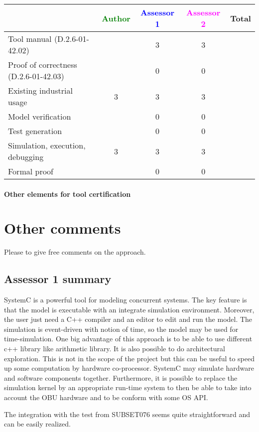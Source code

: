 \begin{assesor1}
\begin{tabular}{|l | c | c | c | c|}
\hline
& \textcolor{green}{Author} & \textcolor{blue}{Assessor 1} & \textcolor{magenta}{Assessor 2} & Total \\
\hline
Tool manual (D.2.6-01-42.02) & &3 &3 & \\
\hline
Proof of correctness (D.2.6-01-42.03) & &0 &0 & \\
\hline
Existing industrial usage &3 &3 &3 & \\
\hline
Model verification & &0 &0 & \\
\hline
Test generation & &0 &0 & \\
\hline
Simulation, execution, debugging &3 &3 &3 & \\
\hline
Formal proof & &0 &0 & \\
\hline
\end{tabular}

\paragraph{Other elements for tool certification}

\section{Other comments}
Please to give free comments on the approach.

\subsection{Assessor 1 summary}
SystemC is a powerful tool for modeling concurrent systems. The key
feature is that the model is executable with  an integrate simulation
environment. Moreover, the user just need a C++ compiler and an editor
to edit and run the model. 
The simulation is event-driven  with notion of time, so the model
may be used for time-simulation.
One big advantage of this approach is to be able to use different c++
library like arithmetic library. It is also possible to do
architectural exploration. This is not in the scope of the project but
this can be useful to speed up some computation by hardware
co-processor. SystemC may simulate hardware and software components together.
Furthermore, it is possible to replace the simulation kernel by an
appropriate run-time system  to then be able
to take into account the OBU hardware and to be conform with some OS
API.

The integration with the test from SUBSET076 seems quite straightforward
and can be easily realized. 


\end{assesor1}
